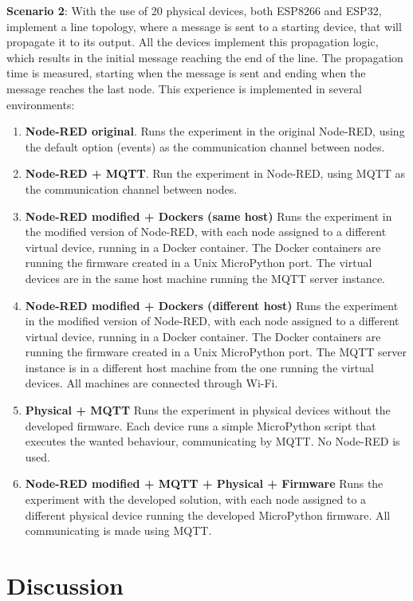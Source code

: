 \textbf{Scenario 2}:
With the use of 20 physical devices, both ESP8266 and ESP32, implement a line topology, where a message is sent to a starting device, that will propagate it to its output. All the devices implement this propagation logic, which results in the initial message reaching the end of the line. The propagation time is measured, starting when the message is sent and ending when the message reaches the last node.
This experience is implemented in several environments:
\begin{enumerate}
    \item \textbf{Node-RED original}. Runs the experiment in the original Node-RED, using the default option (events) as the communication channel between nodes.
    \item \textbf{Node-RED + MQTT}. Run the experiment in Node-RED, using MQTT as the communication channel between nodes.
    \item \textbf{Node-RED modified + Dockers (same host)} Runs the experiment in the modified version of Node-RED, with each node assigned to a different virtual device, running in a Docker container. The Docker containers are running the firmware created in a Unix MicroPython port. The virtual devices are in the same host machine running the MQTT server instance.
    \item \textbf{Node-RED modified + Dockers (different host)} Runs the experiment in the modified version of Node-RED, with each node assigned to a different virtual device, running in a Docker container. The Docker containers are running the firmware created in a Unix MicroPython port. The MQTT server instance is in a different host machine from the one running the virtual devices. All machines are connected through Wi-Fi.
    \item \textbf{Physical + MQTT} Runs the experiment in physical devices without the developed firmware. Each device runs a simple MicroPython script that executes the wanted behaviour, communicating by MQTT. No Node-RED is used.
    \item \textbf{Node-RED modified + MQTT + Physical + Firmware} Runs the experiment with the developed solution, with each node assigned to a different physical device running the developed MicroPython firmware. All communicating is made using MQTT.
\end{enumerate}

\section{Discussion}\label{sec:evaluation_discussion}

